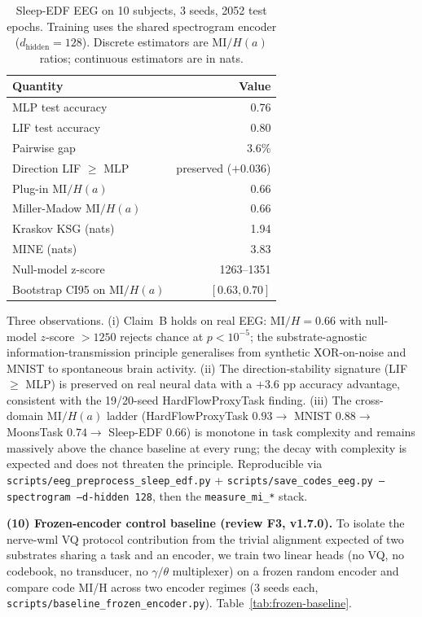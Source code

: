 \documentclass[10pt,twocolumn]{article}
\begin{document}
\begin{table}[t]
  \centering
  \caption{Sleep-EDF EEG on 10 subjects, 3 seeds, 2052 test
  epochs. Training uses the shared spectrogram encoder
  ($d_{\mathrm{hidden}}{=}128$). Discrete estimators are
  $\mathrm{MI}/H(a)$ ratios; continuous estimators are in nats.}
  \label{tab:eeg-sleep-edf}
  \small
  \begin{tabular}{lr}
    \hline
    Quantity & Value \\
    \hline
    MLP test accuracy            & 0.76 \\
    LIF test accuracy            & 0.80 \\
    Pairwise gap                 & 3.6\% \\
    Direction LIF $\geq$ MLP     & preserved ($+0.036$) \\
    Plug-in $\mathrm{MI}/H(a)$   & 0.66 \\
    Miller-Madow $\mathrm{MI}/H(a)$ & 0.66 \\
    Kraskov KSG (nats)           & 1.94 \\
    MINE (nats)                  & 3.83 \\
    Null-model z-score           & 1263--1351 \\
    Bootstrap CI95 on $\mathrm{MI}/H(a)$ & $[0.63, 0.70]$ \\
    \hline
  \end{tabular}
\end{table}

Three observations. (i) Claim~B holds on real EEG: $\mathrm{MI}/H
= 0.66$ with null-model $z$-score $> 1250$ rejects chance at
$p < 10^{-5}$; the substrate-agnostic information-transmission
principle generalises from synthetic XOR-on-noise and MNIST to
spontaneous brain activity. (ii) The direction-stability
signature (LIF $\geq$ MLP) is preserved on real neural data with
a $+3.6$ pp accuracy advantage, consistent with the 19/20-seed
HardFlowProxyTask finding. (iii) The cross-domain
$\mathrm{MI}/H(a)$ ladder (HardFlowProxyTask $0.93 \to$ MNIST
$0.88 \to$ MoonsTask $0.74 \to$ Sleep-EDF $0.66$) is monotone in
task complexity and remains massively above the chance baseline
at every rung; the decay with complexity is expected and does
not threaten the principle. Reproducible via
\texttt{scripts/eeg\_preprocess\_sleep\_edf.py} +
\texttt{scripts/save\_codes\_eeg.py --spectrogram
--d-hidden 128}, then the \texttt{measure\_mi\_*} stack.

\textbf{(10) Frozen-encoder control baseline (review F3, v1.7.0).}
To isolate the nerve-wml VQ protocol contribution from the trivial
alignment expected of two substrates sharing a task and an encoder,
we train two linear heads (no VQ, no codebook, no transducer, no
$\gamma/\theta$ multiplexer) on a frozen random encoder and compare
code MI/H across two encoder regimes (3 seeds each,
\texttt{scripts/baseline\_frozen\_encoder.py}). Table~\ref{tab:frozen-baseline}.
\end{document}

